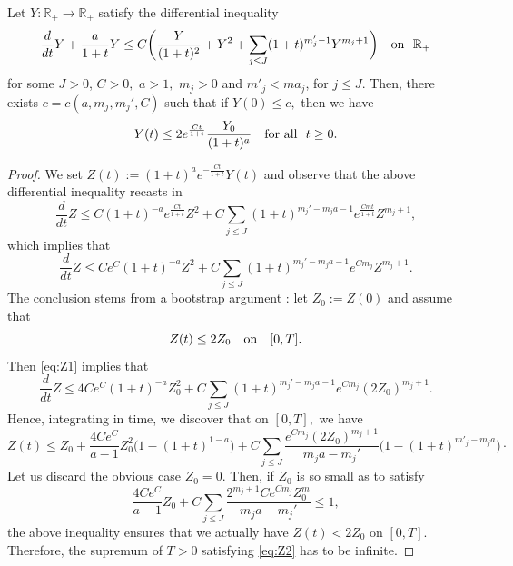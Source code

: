 \documentclass[10pt,a4paper]{amsart}
\newcommand\R{\mathbb{R}}
\begin{document}
\begin{lem}\label{l:ODE} Let $Y:\R_+\to\R_+$ satisfy the differential inequality 
$$\frac d{dt}Y+\frac a{1+t}Y\leq C\biggl(\frac Y{(1+t)^2}+Y^2+\sum_{j\leq J}(1+t)^{m'_j-1}Y^{m_j+1}\biggr)\quad\hbox{on }\ \R_+$$
for some $J>0$, $C>0,$ $a>1,$ $m_j>0$ and $m'_j<ma_j$, for $j\leq J$. 
Then, there exists $c=c(a,m_j,m_j',C)$ such that if $Y(0)\leq c,$ then we have
$$
Y(t)\leq 2e^{\frac{Ct}{1+t}}\frac{Y_0}{(1+t)^a}\quad\hbox{for all }\ t\geq0.
$$
\end{lem}

\begin{proof}
We set $Z(t):=(1+t)^ae^{-\frac{Ct}{1+t}}Y(t)$ and observe that  the above differential inequality recasts in 
$$\frac d{dt} Z\leq C(1+t)^{-a}e^{\frac{Ct}{1+t}}Z^2
+C\sum_{j\leq J}(1+t)^{m_j'-m_ja-1}e^{\frac{Cmt}{1+t}}Z^{m_j+1},$$
which implies that
\begin{equation}\label{eq:Z1}\frac d{dt} Z\leq Ce^C(1+t)^{-a}Z^2+C\sum_{j\leq J}(1+t)^{m_j'-m_ja-1}e^{Cm_j}Z^{m_j+1}.\end{equation}
The conclusion stems from a  bootstrap argument : let $Z_0:=Z(0)$ and  assume that 
\begin{equation}\label{eq:Z2}
Z(t)\leq 2Z_0\quad\hbox{on}\quad [0,T].\end{equation}
 Then \eqref{eq:Z1} implies that
$$\frac d{dt} Z\leq 4Ce^C(1+t)^{-a}Z_0^2+C\sum_{j\leq J}(1+t)^{m_j'-m_ja-1}e^{Cm_j}(2Z_0)^{m_j+1}.$$
Hence, integrating in time, we discover that on $[0,T],$ we have
$$Z(t)\leq Z_0+\frac{4Ce^C}{a-1}Z_0^2\bigl(1-(1+t)^{1-a}\bigr)+C\sum_{j\leq J}\frac{e^{Cm_j}(2Z_0)^{m_j+1}}{m_ja-m_j'}\bigl(1-(1+t)^{m'_j-m_ja}\bigr)\cdotp$$
Let us discard the obvious case $Z_0=0.$ Then, if  $Z_0$ is so small as to satisfy 
$$\frac{4Ce^C}{a-1}Z_0+C\sum_{j\leq J}\frac{2^{m_j+1}Ce^{Cm_j} Z_0^m}{m_ja-m_j'}\leq 1,$$
the above inequality ensures that  we actually have $Z(t)<2Z_0$ on $[0,T]$. Therefore, the supremum of $T>0$ satisfying \eqref{eq:Z2} has to be infinite.
\end{proof}
\end{document}
